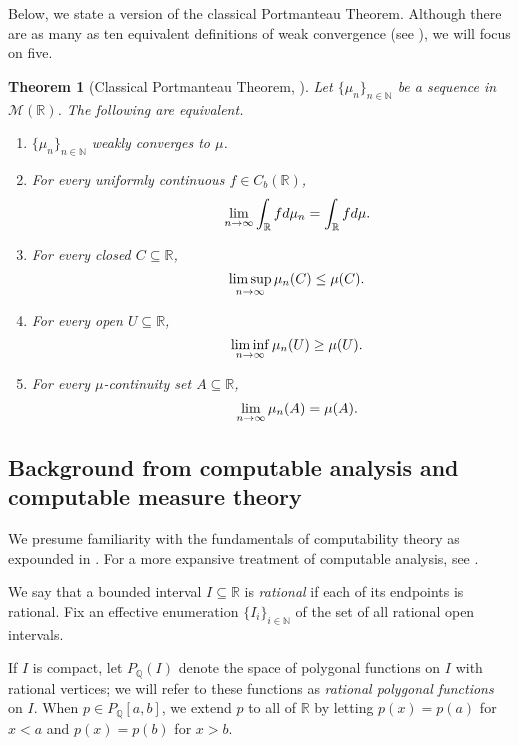 \documentclass{amsart}
\newcommand{\Q}{\mathbb{Q}}
\newcommand{\R}{\mathbb{R}}
\newcommand{\N}{\mathbb{N}}
\newcommand{\M}{\mathcal{M}}
\newtheorem{theorem}{Theorem}[section]
\theoremstyle{definition}
\numberwithin{equation}{section}
\begin{document}
Below, we state a version of the classical Portmanteau Theorem. 
Although there are as many as ten equivalent definitions of weak convergence (see \cite{LKN16}), we will focus on five.

\begin{theorem}[Classical Portmanteau Theorem, \cite{A41}]\label{thm:cpt}
Let $\{\mu_n\}_{n\in\N}$ be a sequence in $\M(\R)$. The following are equivalent.
	\begin{enumerate}
    		\item $\{\mu_n\}_{n\in\N}$ weakly converges to $\mu$.
    		\item For every uniformly continuous $f\in C_b(\R)$,
    		\[\hspace{0.5in}
    		\lim_{n\rightarrow\infty}\int_{\R}fd\mu_n=\int_{\R}fd\mu.
    		\]
    		\item For every closed $C\subseteq\R$, 
			\[\hspace{0.5in}
			\limsup_{n\rightarrow\infty}\mu_n(C)\leq\mu(C).
			\]
    		\item For every open $U\subseteq\R$, 
			\[\hspace{0.5in}
			\liminf_{n\rightarrow\infty}\mu_n(U)\geq\mu(U).
			\]
    		\item For every $\mu$-continuity set $A\subseteq\R$, 
			\[\hspace{0.5in}
			\lim_{n\rightarrow\infty}\mu_n(A)=\mu(A).
			\]
	\end{enumerate}
\end{theorem}

\subsection{Background from computable analysis and computable measure theory}

We presume familiarity with the fundamentals of computability theory as expounded in \cite{Cooper.2004}.  
For a more expansive treatment of computable analysis, see \cite{Weihrauch.2000}.

We say that a bounded interval $I\subseteq\R$ is \emph{rational} if each of its endpoints is rational.  Fix an effective enumeration $\{I_i\}_{i\in\N}$ of the set of all rational open intervals. 

If $I$ is compact, let $P_{\Q}(I)$ denote the space of polygonal functions on $I$ with rational vertices; we will refer to these functions as \emph{rational polygonal functions} on $I$.
When $p\in P_{\Q}[a,b]$,  we extend $p$ to all of $\R$ by letting $p(x)=p(a)$ for $x<a$ and $p(x)=p(b)$ for $x>b$.
\end{document}
